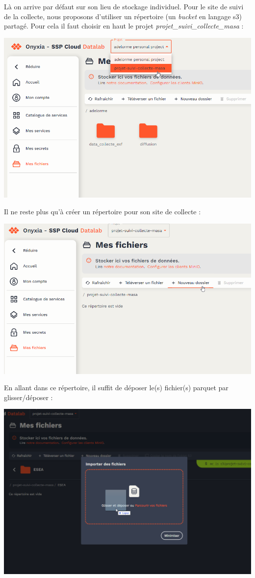 \documentclass[
  letterpaper,
  DIV=11,
  numbers=noendperiod]{scrreprt}
\begin{document}
Là on arrive par défaut sur son lieu de stockage individuel. Pour le
site de suivi de la collecte, nous proposons d'utiliser un répertoire
(un \emph{bucket} en langage s3) partagé. Pour cela il faut choisir en
haut le projet \emph{projet\_suivi\_collecte\_masa} :

\includegraphics{./images/data_choix_projet.png}

Il ne reste plus qu'à créer un répertoire pour son site de collecte :

\includegraphics{./images/data_creation_nouveau_dossier.png}

En allant dans ce répertoire, il suffit de déposer le(s) fichier(s)
parquet par glisser/déposer :

\includegraphics{./images/data_upload_data.png}
\end{document}
